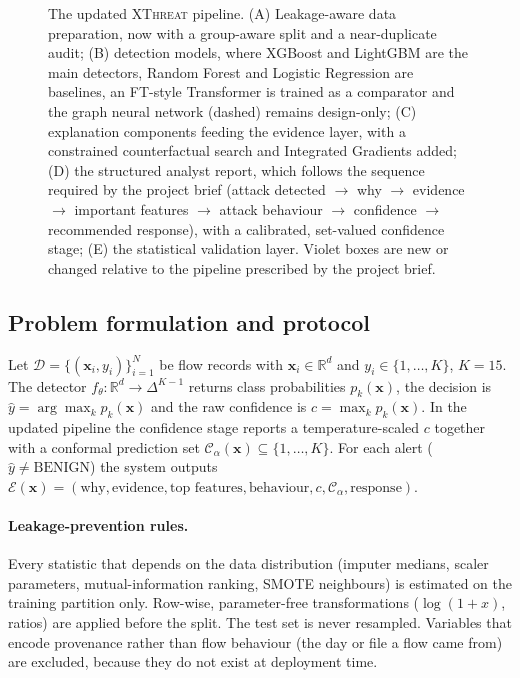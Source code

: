 \documentclass[11pt,a4paper]{article}
\newcommand{\XT}{\textsc{XThreat}}
\begin{document}
\begin{figure}[tbp]
\caption{The updated \XT{} pipeline. (A) Leakage-aware data preparation, now with a group-aware split and a near-duplicate audit; (B) detection models, where XGBoost and LightGBM are the main detectors, Random Forest and Logistic Regression are baselines, an FT-style Transformer is trained as a comparator and the graph neural network (dashed) remains design-only; (C) explanation components feeding the evidence layer, with a constrained counterfactual search and Integrated Gradients added; (D) the structured analyst report, which follows the sequence required by the project brief (attack detected $\rightarrow$ why $\rightarrow$ evidence $\rightarrow$ important features $\rightarrow$ attack behaviour $\rightarrow$ confidence $\rightarrow$ recommended response), with a calibrated, set-valued confidence stage; (E) the statistical validation layer. Violet boxes are new or changed relative to the pipeline prescribed by the project brief.}
\label{fig:pipeline}
\end{figure}

\subsection{Problem formulation and protocol}
Let $\mathcal{D}=\{(\mathbf{x}_i,y_i)\}_{i=1}^{N}$ be flow records with $\mathbf{x}_i\in\mathbb{R}^{d}$ and $y_i\in\{1,\dots,K\}$, $K=15$. The detector $f_\theta:\mathbb{R}^{d}\to\Delta^{K-1}$ returns class probabilities $p_k(\mathbf{x})$, the decision is $\hat{y}=\arg\max_k p_k(\mathbf{x})$ and the raw confidence is $c=\max_k p_k(\mathbf{x})$. In the updated pipeline the confidence stage reports a temperature-scaled $c$ together with a conformal prediction set $\mathcal{C}_\alpha(\mathbf{x})\subseteq\{1,\dots,K\}$. For each alert ($\hat{y}\neq\text{BENIGN}$) the system outputs $\mathcal{E}(\mathbf{x})=(\text{why},\text{evidence},\text{top features},\text{behaviour},c,\mathcal{C}_\alpha,\text{response})$.

\paragraph{Leakage-prevention rules.} Every statistic that depends on the data distribution (imputer medians, scaler parameters, mutual-information ranking, SMOTE neighbours) is estimated on the training partition only. Row-wise, parameter-free transformations ($\log(1+x)$, ratios) are applied before the split. The test set is never resampled. Variables that encode provenance rather than flow behaviour (the day or file a flow came from) are excluded, because they do not exist at deployment time.
\end{document}
